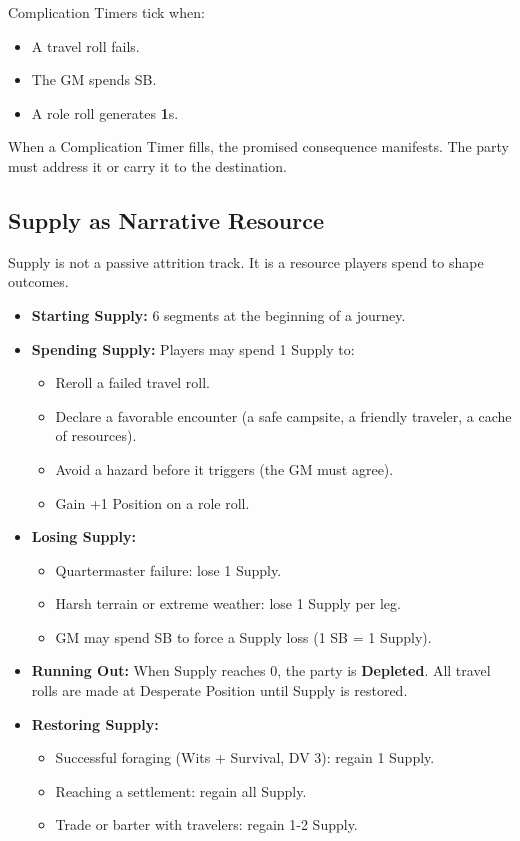Complication Timers tick when:
\begin{itemize}
\item A travel roll fails.
\item The GM spends SB.
\item A role roll generates \textbf{1}s.
\end{itemize}

When a Complication Timer fills, the promised consequence manifests. The party must address it or carry it to the destination.

\subsection*{Supply as Narrative Resource}
\label{sec:travel-supply}

Supply is not a passive attrition track. It is a resource players spend to shape outcomes.

\begin{itemize}
\item \textbf{Starting Supply:} 6 segments at the beginning of a journey.
\item \textbf{Spending Supply:} Players may spend 1 Supply to:
  \begin{itemize}
  \item Reroll a failed travel roll.
  \item Declare a favorable encounter (a safe campsite, a friendly traveler, a cache of resources).
  \item Avoid a hazard before it triggers (the GM must agree).
  \item Gain +1 Position on a role roll.
  \end{itemize}
\item \textbf{Losing Supply:}
  \begin{itemize}
  \item Quartermaster failure: lose 1 Supply.
  \item Harsh terrain or extreme weather: lose 1 Supply per leg.
  \item GM may spend SB to force a Supply loss (1 SB = 1 Supply).
  \end{itemize}
\item \textbf{Running Out:} When Supply reaches 0, the party is \textbf{Depleted}. All travel rolls are made at Desperate Position until Supply is restored.
\item \textbf{Restoring Supply:}
  \begin{itemize}
  \item Successful foraging (Wits + Survival, DV 3): regain 1 Supply.
  \item Reaching a settlement: regain all Supply.
  \item Trade or barter with travelers: regain 1-2 Supply.
  \end{itemize}
\end{itemize}

